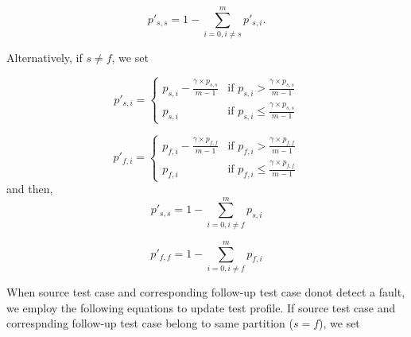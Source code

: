 \documentclass[10pt,journal,compsoc]{IEEEtran}
\begin{document}
\begin{equation}
\label{eq:MAPTKillOneSameS}
p'_{s, s} = 1 - \sum\limits_{i = 0, i \ne s}^{m}p'_{s, i}.
\end{equation}

Alternatively, if $s \ne f$, we set

\begin{equation}
\label{eq:MAPTKillOneNotSameSI}
p'_{s, i} =
\begin{cases}
p_{s, i} - \displaystyle\frac{\gamma \times p_{s, s}}{m - 1}& \text{if }p_{s, i} > \displaystyle\frac{\gamma \times p_{s, s}}{m - 1} \\
p_{s, i}                                                    & \text{if } p_{s, i} \leq \displaystyle\frac{\gamma \times p_{s, s}}{m - 1}
\end{cases}
\end{equation}

\begin{equation}
\label{eq:MAPTKillOneNotSameFI}
p'_{f, i} =
\begin{cases}
p_{f, i} - \displaystyle\frac{\gamma \times p_{f, f}}{m - 1}& \text{if }p_{f, i} > \displaystyle\frac{\gamma \times p_{f, f}}{m - 1} \\
p_{f, i}                                                    & \text{if } p_{f, i} \leq \displaystyle\frac{\gamma \times p_{f, f}}{m - 1}
\end{cases}
\end{equation}
and then,
\begin{equation}
\label{eq:MAPTKillOneNotSameSS}
p'_{s, s} = 1 - \sum\limits_{i = 0, i \ne f}^{m}p_{s, i}
\end{equation}

\begin{equation}
\label{eq:MAPTKillOneNotSameFF}
p'_{f, f} = 1 - \sum\limits_{i = 0, i \ne f}^{m}p_{f, i}
\end{equation}

When source test case and corresponding follow-up test case donot detect a fault, we employ the following equations to update test profile. If source test case and correspnding follow-up test case belong to same partition ($s = f$), we set
\end{document}
